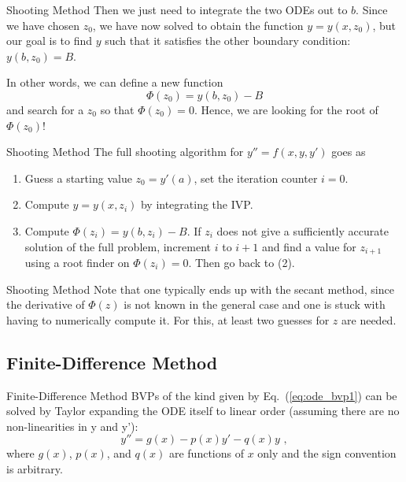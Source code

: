 \documentclass[11pt]{beamer}
\begin{document}
\begin{frame}[fragile]{Shooting Method}
Then we just need to integrate
the two ODEs out to $b$. Since we have chosen $z_0$, we have now solved 
to obtain the function
$y=y(x,z_0)$, but our goal is to find $y$ such that it satisfies the other boundary condition: $y(b,z_0) = B$.

In other words, we can define a new function 
\begin{equation}
\Phi(z_0) = y(b,z_0) - B
\end{equation}
and search for a $z_0$ so that $\Phi(z_0) = 0$. Hence, we are looking
for the root of $\Phi(z_0)$!
\end{frame}

\begin{frame}[fragile]{Shooting Method}
The full shooting algorithm for $y'' = f(x,y,y')$ goes as

\begin{enumerate}
\item Guess a starting value $z_0 = y'(a)$, set the iteration counter 
$i = 0$.
\item Compute $y = y(x,z_i)$ by integrating the IVP.
\item Compute $\Phi(z_i) = y(b,z_i) - B$. If $z_i$ does not
      give a sufficiently accurate solution of the full problem,
      increment $i$ to $i+1$ and find  a value for
      $z_{i+1}$ using a root finder on $\Phi(z_i) = 0$. 
      Then go back to (2).
\end{enumerate}
\end{frame}

\begin{frame}[fragile]{Shooting Method}
Note that one typically ends up with the secant method, since the
derivative of $\Phi(z)$ is not known in the general case and one is
stuck with having to numerically compute it. For this, at least two
guesses for $z$ are needed.
\end{frame}

\subsection{Finite-Difference Method}
\begin{frame}[fragile]{Finite-Difference Method}
BVPs of the kind given by Eq.~(\ref{eq:ode_bvp1}) can be solved
by Taylor expanding the ODE itself to linear
order (assuming there are no non-linearities in y and y'):
\begin{equation}
y'' = g(x) - p(x)y' - q(x) y\,\,,
\label{eq:ode_bvp2}
\end{equation}
where $g(x)$, $p(x)$, and $q(x)$ are functions of $x$ only and the sign
convention is arbitrary.
\end{frame}
\end{document}
